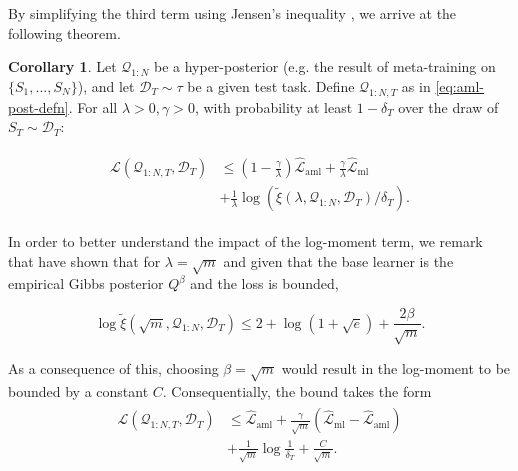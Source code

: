 \documentclass{article} %
\theoremstyle{definition}
\newtheorem{corollary}[theorem]{Corollary}
\begin{document}
By simplifying the third term using Jensen's inequality , we arrive at the following theorem.

\begin{corollary} \label{thm:main-result-gibbs}
	Let $\mathcal{Q}_{1:N}$ be a hyper-posterior (e.g. the result of meta-training on $\{S_1,...,S_N\}$), and let $\mathcal{D}_T\sim \tau$ be a given test task. Define  $\mathcal{Q}_{1:N,T}$ as in \eqref{eq:aml-post-defn}. 
	For all $\lambda>0, \gamma>0$, 
	with probability at least $1-\delta_T$ over the draw of $S_T\sim \mathcal{D}_T$:
	
	\begin{align} \label{eq:pb-adapt-multi}
	\begin{split}
	\mathcal{L}(\mathcal{Q}_{1:N,T}, \mathcal{D}_T) &\leq 
	(1-\frac{\gamma}{\lambda})\hat{\mathcal{L}}_{\mathrm{aml}} + \frac{\gamma}{\lambda}\hat{\mathcal{L}}_{\mathrm{ml}} \\
	&+\frac{1}{\lambda}\log\left (\tilde{\xi}(\lambda,\mathcal{Q}_{1:N},\mathcal{D}_T)/\delta_T\right ) .
	\end{split}
	\end{align}
\end{corollary}

In order to better understand the impact of the log-moment term, we remark that \citet{Rivasplata2020} have shown that for $\lambda=\sqrt{m}$ and given that the base learner is the empirical Gibbs posterior $Q^\beta$ and the loss is bounded,

$$\log\tilde{\xi}(\sqrt{m},\mathcal{Q}_{1:N},\mathcal{D}_T) \leq 2+\log(1+\sqrt{e})+\frac{2\beta}{\sqrt{m}} .$$

As a consequence of this, choosing $\beta=\sqrt{m}$ would result 
in the log-moment to be bounded by a constant $C$. Consequentially, the bound takes the form
    \begin{align*}
    \begin{split}
    \mathcal{L}(\mathcal{Q}_{1:N,T}, \mathcal{D}_T) &\leq \hat{\mathcal{L}}_{\mathrm{aml}} +
    \frac{\gamma}{\sqrt{m}}(\hat{\mathcal{L}}_{\mathrm{ml}}-\hat{\mathcal{L}}_{\mathrm{aml}}) \\
&+\frac{1}{\sqrt{m}}\log\frac{1}{\delta_T}+\frac{C}{\sqrt{m}} .
    \end{split}
    \end{align*}
\end{document}
